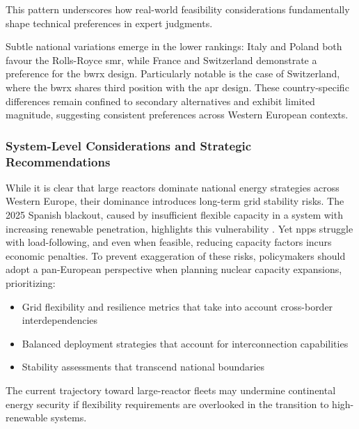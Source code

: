 This pattern underscores how real-world feasibility considerations fundamentally shape technical preferences in expert judgments.

Subtle national variations emerge in the lower rankings: Italy and Poland both favour the Rolls-Royce \gls{smr}, while France and Switzerland demonstrate a preference for the \gls{bwrx} design. Particularly notable is the case of Switzerland, where the \gls{bwrx} shares third position with the \gls{apr} design. These country-specific differences remain confined to secondary alternatives and exhibit limited magnitude, suggesting consistent preferences across Western European contexts.

\subsubsection{System-Level Considerations and Strategic Recommendations}

While it is clear that large reactors dominate national energy strategies across Western Europe, their dominance introduces long-term grid stability risks. The 2025 Spanish blackout, caused by insufficient flexible capacity in a system with increasing renewable penetration, highlights this vulnerability \cite{ENTSO-BLACKOUT-REPORT}. Yet \glspl{npp} struggle with load-following, and even when feasible, reducing capacity factors incurs economic penalties. To prevent exaggeration of these risks, policymakers should adopt a pan-European perspective when planning nuclear capacity expansions, prioritizing:
\begin{itemize}
    \item Grid flexibility and resilience metrics that take into account cross-border interdependencies
    \item Balanced deployment strategies that account for interconnection capabilities
    \item Stability assessments that transcend national boundaries
\end{itemize}

The current trajectory toward large-reactor fleets may undermine continental energy security if flexibility requirements are overlooked in the transition to high-renewable systems.